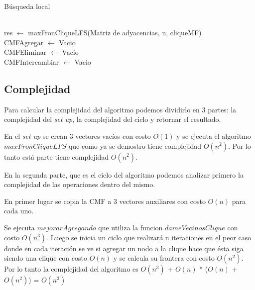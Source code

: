\begin{algorithm}[H]
\begin{algorithmic}
\caption{Búsqueda local}
		\State{}\\
		res $\leftarrow$ maxFronCliqueLFS(Matriz de adyacencias, n, cliqueMF)\\
		CMFAgregar $\leftarrow$ Vacio\\
		CMFEliminar $\leftarrow$ Vacio\\
		CMFIntercambiar $\leftarrow$ Vacio\\
	\EndFunction
\end{algorithmic}
\end{algorithm}

\subsection{Complejidad}

Para calcular la complejidad del algoritmo podemos dividirlo en 3 partes: la complejidad del \textit{set up}, la complejidad del ciclo y retornar el resultado.

En el \textit{set up} se crean 3 vectores vacíos con costo $O(1)$ y se ejecuta el algoritmo $maxFronCliqueLFS$ que como ya se demostro tiene complejidad $O(n^2)$. Por lo tanto está parte tiene complejidad $O(n^2)$.

En la segunda parte, que es el ciclo del algoritmo podemos analizar primero la complejidad de las operaciones dentro del mismo.

En primer lugar se copia la CMF a 3 vectores auxiliares con costo $O(n)$ para cada uno.

Se ejecuta $mejorarAgregando$ que utiliza la funcion $dameVecinosClique$ con costo $O(n^3)$. Luego se inicia un ciclo que realizará n iteraciones en el peor caso donde en cada iteración se ve si agregar un nodo a la clique hace que ésta siga siendo una clique con costo $O(n)$ y se calcula su frontera con costo $O(n^2)$. Por lo tanto la complejidad del algoritmo es $O(n^3)$ + $O(n)$ * ($O(n)$ + $O(n^2)$) = $O(n^3)$

